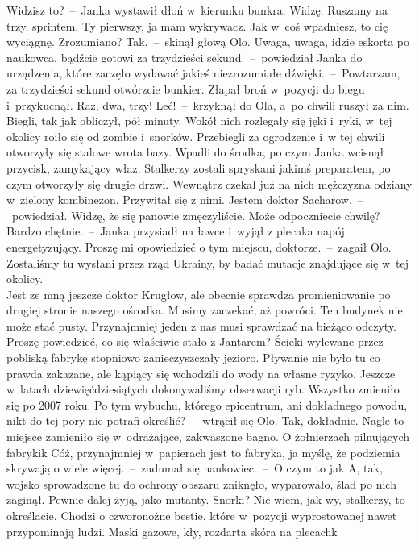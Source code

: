 \documentclass[../MAIN.tex]{subfiles}
\begin{document}
\sx Widzisz to?~--~Janka wystawił dłoń w~kierunku bunkra.
\xx Widzę.
\xx Ruszamy na trzy, sprintem. Ty pierwszy, ja mam wykrywacz. Jak w~coś wpadniesz, to cię wyciągnę. Zrozumiano?
\xx Tak.~--~skinął głową Olo.
\xx Uwaga, uwaga, idzie eskorta po naukowca, bądźcie gotowi za trzydzieści sekund.~--~powiedział Janka do urządzenia, które zaczęło wydawać jakieś niezrozumiałe dźwięki.~--~Powtarzam, za trzydzieści sekund otwórzcie bunkier.
\qm
Złapał broń w~pozycji do biegu i~przykucnął.
\sx Raz, dwa, trzy! Leć!~--~krzyknął do Ola, a~po chwili ruszył za nim.
\qm
Biegli, tak jak obliczył, pół minuty. Wokół nich rozlegały się jęki i~ryki, w~tej okolicy roiło się od zombie i~snorków. Przebiegli za ogrodzenie i~w tej chwili otworzyły się stalowe wrota bazy. Wpadli do środka, po czym Janka wcisnął przycisk, zamykający właz. Stalkerzy zostali spryskani jakimś preparatem, po czym otworzyły się drugie drzwi. Wewnątrz czekał już na nich mężczyzna odziany w~zielony kombinezon. Przywitał się z nimi.
\sx Jestem doktor Sacharow.~--~powiedział.
\xx Widzę, że się panowie zmęczyliście. Może odpoczniecie chwilę?
\xx Bardzo chętnie.~--~Janka przysiadł na ławce i~wyjął z plecaka napój energetyzujący.
\xx Proszę mi opowiedzieć o tym miejscu, doktorze.~--~zagaił Olo.
\xx Zostaliśmy tu wysłani przez rząd Ukrainy, by badać mutacje znajdujące się w~tej okolicy.\\ Jest ze mną jeszcze doktor Krugłow, ale obecnie sprawdza promieniowanie po drugiej stronie naszego ośrodka. Musimy zaczekać, aż powróci. Ten budynek nie może stać pusty. Przynajmniej jeden z nas musi sprawdzać na bieżąco odczyty.
\xx Proszę powiedzieć, co się właściwie stało z Jantarem?
\xx Ścieki wylewane przez pobliską fabrykę stopniowo zanieczyszczały jezioro. Pływanie nie było tu co prawda zakazane, ale kąpiący się wchodzili do wody na własne ryzyko. Jeszcze w~latach dziewięćdziesiątych dokonywaliśmy obserwacji ryb. Wszystko zmieniło się po 2007 roku.
\xx Po tym wybuchu, którego epicentrum, ani dokładnego powodu, nikt do tej pory nie potrafi określić?~--~wtrącił się Olo.
\xx Tak, dokładnie. Nagle to miejsce zamieniło się w~odrażające, zakwaszone bagno. O żołnierzach pilnujących fabryki\3k Cóż, przynajmniej w~papierach jest to fabryka, ja myślę, że podziemia skrywają o wiele więcej.~--~zadumał się naukowiec.~--~O czym to ja\3k A, tak, wojsko sprowadzone tu do ochrony obszaru zniknęło, wyparowało, ślad po nich zaginął. Pewnie dalej żyją, jako mutanty.
\xx Snorki?
\xx Nie wiem, jak wy, stalkerzy, to określacie. Chodzi o czworonożne bestie, które w~pozycji wyprostowanej nawet przypominają ludzi. Maski gazowe, kły, rozdarta skóra na plecach\3k
\end{document}
